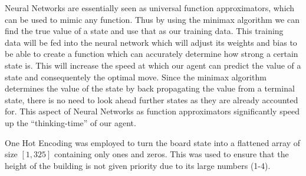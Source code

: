 \documentclass[a4paper,12pt,table]{article}
\begin{document}
Neural Networks are essentially seen as universal function approximators, which can be used to mimic any function. Thus by using the minimax algorithm we can find the true value of a state and use that as our training data. This training data will be fed into the neural network which will adjust its weights and bias to be able to create a function which can accurately determine how strong a certain state is. This will increase the speed at which our agent can predict the value of a state and consequentely the optimal move. Since the minimax algorithm determines the value of the state by back propagating the value from a terminal state, there is no need to look ahead further states as they are already accounted for. This aspect of Neural Networks as function approximators significantly speed up the “thinking-time” of our agent. \par

One Hot Encoding was employed to turn the board state into a flattened array of size $[1,325]$ containing only ones and zeros. This was used to ensure that the height of the building is not given priority due to its large numbers (1-4). \par
\end{document}
